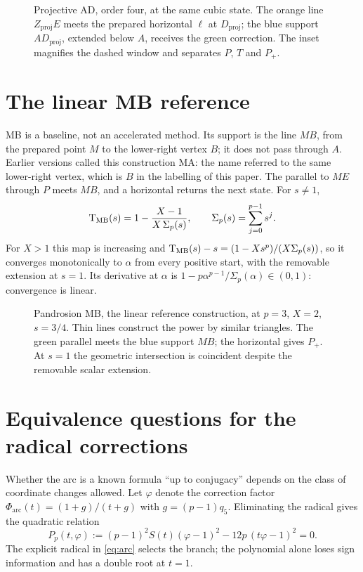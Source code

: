 \begin{figure}[h]
\centering\figProjective
\caption{Projective AD, order four, at the same cubic state. The orange line $Z_{\mathrm{proj}}E$ meets
the prepared horizontal $\ell$ at $D_{\mathrm{proj}}$; the blue support $AD_{\mathrm{proj}}$, extended
below $A$, receives the green correction. The inset magnifies the dashed window and separates $P$, $T$
and $P_+$.}\label{fig:proj}
\end{figure}

\section{The linear MB reference}\label{app:mb}

MB is a baseline, not an accelerated method. Its support is the line $MB$, from the prepared point $M$
to the lower-right vertex $B$; it does not pass through $A$. Earlier versions called this construction
MA: the name referred to the same lower-right vertex, which is $B$ in the labelling of this paper. The
parallel to $ME$ through $P$ meets $MB$, and a horizontal returns the next state. For $s\neq1$,
\[ \mathrm{T}_{\mathrm{MB}}(s)=1-\frac{X-1}{X\,\Sigma_p(s)},\qquad \Sigma_p(s)=\sum_{j=0}^{p-1}s^{j}. \]
For $X>1$ this map is increasing and
$\mathrm{T}_{\mathrm{MB}}(s)-s=(1-Xs^{p})/(X\Sigma_p(s))$, so it converges monotonically to $\alpha$ from every
positive start, with the removable extension at $s=1$. Its derivative at $\alpha$ is
$1-p\alpha^{p-1}/\Sigma_p(\alpha)\in(0,1)$: convergence is linear.

\begin{figure}[h]
\centering\figMB
\caption{Pandrosion MB, the linear reference construction, at $p=3$, $X=2$, $s=3/4$. Thin lines
construct the power by similar triangles. The green parallel meets the blue support $MB$; the
horizontal gives $P_+$. At $s=1$ the geometric intersection is coincident despite the removable scalar
extension.}\label{fig:mb}
\end{figure}

\FloatBarrier
\section{Equivalence questions for the radical corrections}\label{app:equiv}

Whether the arc is a known formula ``up to conjugacy'' depends on the class of coordinate changes
allowed. Let $\varphi$ denote the correction factor $\Phi_{\mathrm{arc}}(t)=(1+g)/(t+g)$ with
$g=(p-1)q_5$. Eliminating the radical gives the quadratic relation
\begin{equation}\label{eq:quad}
P_p(t,\varphi):=(p-1)^{2}S(t)(\varphi-1)^{2}-12p\,(t\varphi-1)^{2}=0 .
\end{equation}
The explicit radical in \eqref{eq:arc} selects the branch; the polynomial alone loses sign information
and has a double root at $t=1$.

